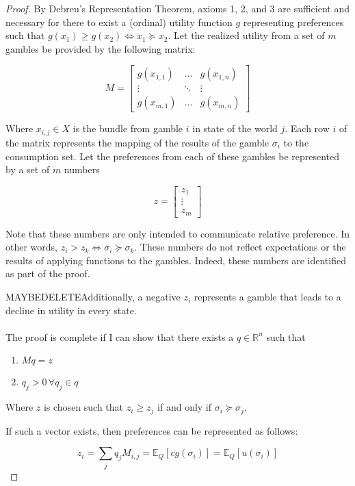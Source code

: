 \documentclass{article}
\begin{document}
\begin{proof}
By Debreu's Representation Theorem, axioms 1, 2, and 3 are sufficient and necessary for there to exist a (ordinal) utility function \(g\) representing preferences such that \(g(x_1)\geq g(x_2) \Leftrightarrow x_1 \succeq x_2 \).  Let the realized utility from a set of \(m\) gambles be provided by the following matrix:

\[M=\begin{bmatrix}
	g(x_{1, 1}) & \ldots & g(x_{1, n})\\
	\vdots & \ddots & \vdots \\
	g(x_{m, 1}) & \ldots & g(x_{m, n})
\end{bmatrix}
\]

Where \(x_{i, j} \in X\) is the bundle from gamble \(i\) in state of the world \(j\).  Each row  \(i\) of the matrix represents the mapping of the results of the gamble \(\sigma_i\) to the consumption set. Let the preferences from each of these gambles be represented by a set of \(m\) numbers

\[z=\begin{bmatrix}
z_1 \\ \vdots\\ z_m
\end{bmatrix}\]


Note that these numbers are only intended to communicate relative preference.  In other words, \(z_i > z_k \Leftrightarrow \sigma_i \succeq \sigma_k\).  These numbers do not reflect expectations or the results of applying functions to the gambles.  Indeed, these numbers are identified as part of the proof.

MAYBEDELETEAdditionally, a negative \(z_i\) represents a gamble that leads to a decline in utility in every state.   
\\
\\
The proof is complete if I can show that there exists a \(q \in \mathbb{R}^n\) such that 
\begin{enumerate}
	\item \(Mq=z\)
	\item \(q_j>0 \, \forall q_j \in q\)
\end{enumerate}
Where \(z\) is chosen such that \(z_i \geq z_j\) if and only if  \(\sigma_i \succeq \sigma_j\).

If such a vector exists, then preferences can be represented as follows:

\[z_i=\sum_j q_j M_{i, j} = \mathbb{E}_Q \left[ c g(\sigma_i) \right] =\mathbb{E}_Q\left[u(\sigma_i)\right] \]


\end{proof}
\end{document}
